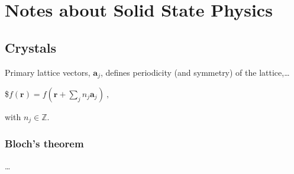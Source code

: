 \documentclass[letterpaper,10pt,english]{jupyterBook}
\begin{document}
\sphinxstepscope


\chapter{Notes about Solid State Physics}
\label{\detokenize{ch/solid-state/notes-solid-state:notes-about-solid-state-physics}}\label{\detokenize{ch/solid-state/notes-solid-state:solid-state-notes}}\label{\detokenize{ch/solid-state/notes-solid-state::doc}}

\section{Crystals}
\label{\detokenize{ch/solid-state/notes-solid-state:crystals}}\label{\detokenize{ch/solid-state/notes-solid-state:solid-state-crystals}}
\sphinxAtStartPar
Primary lattice vectors, \(\mathbf{a}_j\), defines periodicity (and symmetry) of the lattice,…

\sphinxAtStartPar
\$\(f(\mathbf{r}) = f \left( \mathbf{r} + \sum_j n_j \mathbf{a}_j \right) \ ,\)

\sphinxAtStartPar
with \(n_j \in \mathbb{Z}\).


\subsection{Bloch’s theorem}
\label{\detokenize{ch/solid-state/notes-solid-state:bloch-s-theorem}}\label{\detokenize{ch/solid-state/notes-solid-state:solid-state-crystals-bloch-thm}}
\sphinxAtStartPar
…

\sphinxstepscope
\end{document}
